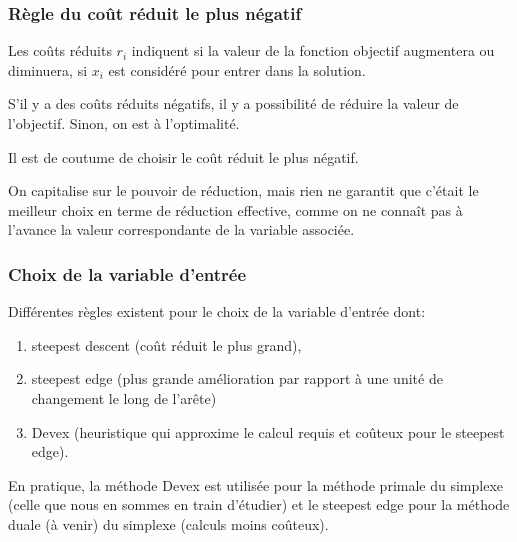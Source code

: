 \documentclass[t,usepdftitle=false]{beamer}
\begin{document}
\begin{frame}
\frametitle{Règle du coût réduit le plus négatif}

Les coûts réduits $r_i$ indiquent si la valeur de la fonction objectif augmentera ou diminuera, si $x_i$ est considéré pour entrer dans la solution.

\mbox{}

S'il y a des coûts réduits négatifs, il y a possibilité de réduire la valeur de l'objectif. Sinon, on est à l'optimalité.

\mbox{}

Il est de coutume de choisir le coût réduit le plus négatif.

\mbox{}

On capitalise sur le pouvoir de réduction, mais rien ne garantit que c'était le meilleur choix en terme de réduction effective, comme on ne connaît pas à l'avance la valeur correspondante de la variable associée.

\end{frame}

\begin{frame}
\frametitle{Choix de la variable d'entrée}

Différentes règles existent pour le choix de la variable
d’entrée dont:
\begin{enumerate}
\item
steepest descent (coût réduit le plus grand),
\item
steepest edge (plus grande amélioration par rapport à une unité de changement le long de l'arête)
\item
Devex (heuristique qui approxime le calcul requis et coûteux pour le steepest edge).
\end{enumerate}
En pratique, la méthode Devex est utilisée pour la méthode primale du simplexe (celle que nous en sommes en train d'étudier) et le steepest edge pour la méthode duale (à venir) du simplexe
(calculs moins coûteux).

\end{frame}
\end{document}
